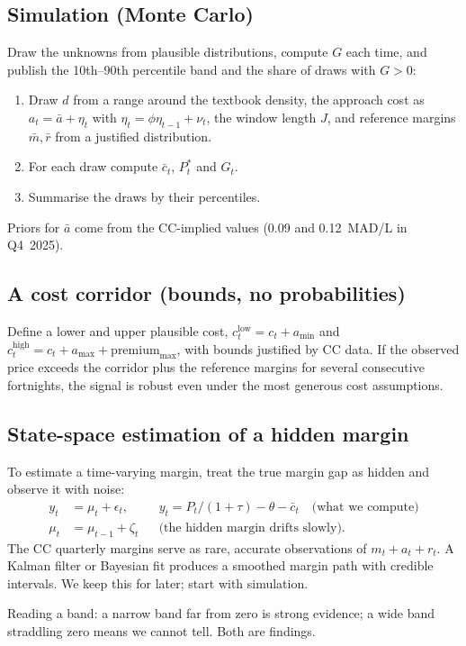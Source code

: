 \documentclass[11pt,a4paper]{article}
\theoremstyle{definition}
\begin{document}
\subsection{Simulation (Monte Carlo)}
Draw the unknowns from plausible distributions, compute $G$ each time, and publish the 10th--90th percentile band and the share of draws with $G>0$:
\begin{enumerate}[leftmargin=2em]
\item Draw $d$ from a range around the textbook density, the approach cost as $a_t=\bar a+\eta_t$ with $\eta_t=\phi\eta_{t-1}+\nu_t$, the window length $J$, and reference margins $\bar m,\bar r$ from a justified distribution.
\item For each draw compute $\bar c_t$, $P^{\ast}_t$ and $G_t$.
\item Summarise the draws by their percentiles.
\end{enumerate}
Priors for $\bar a$ come from the CC-implied values (0.09 and 0.12~MAD/L in Q4~2025).

\subsection{A cost corridor (bounds, no probabilities)}
Define a lower and upper plausible cost, $c^{\text{low}}_t=c_t+a_{\min}$ and $c^{\text{high}}_t=c_t+a_{\max}+\text{premium}_{\max}$, with bounds justified by CC data. If the observed price exceeds the corridor plus the reference margins for several consecutive fortnights, the signal is robust even under the most generous cost assumptions.

\subsection{State-space estimation of a hidden margin}
To estimate a time-varying margin, treat the true margin gap as hidden and observe it with noise:
\begin{align}
y_t &= \mu_t + \epsilon_t, && y_t = P_t/(1+\tau)-\theta-\bar c_t \quad\text{(what we compute)}\\
\mu_t &= \mu_{t-1} + \zeta_t &&\text{(the hidden margin drifts slowly)}.
\end{align}
The CC quarterly margins serve as rare, accurate observations of $m_t+a_t+r_t$. A Kalman filter or Bayesian fit produces a smoothed margin path with credible intervals. We keep this for later; start with simulation.

\begin{intuition}
Reading a band: a narrow band far from zero is strong evidence; a wide band straddling zero means we cannot tell. Both are findings.
\end{intuition}
\end{document}
